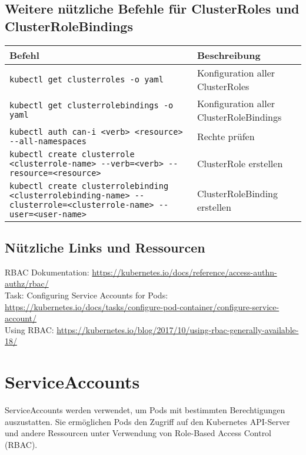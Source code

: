 \subsection{Weitere nützliche Befehle für ClusterRoles und ClusterRoleBindings}
\begin{tabular}{
|p{}|p{}|}
\hline
\textbf{Befehl} & \textbf{Beschreibung} \\
\hline
\texttt{kubectl get clusterroles -o yaml} & Konfiguration aller ClusterRoles \\
\texttt{kubectl get clusterrolebindings -o yaml} & Konfiguration aller ClusterRoleBindings \\
\texttt{kubectl auth can-i <verb> <resource> {-}{-}all-namespaces} & Rechte prüfen \\
\texttt{kubectl create clusterrole <clusterrole-name> {-}{-}verb=<verb> {-}{-}resource=<resource>} & ClusterRole erstellen \\
\texttt{kubectl create clusterrolebinding <clusterrolebinding-name> {-}{-}clusterrole=<clusterrole-name> {-}{-}user=<user-name>} & ClusterRoleBinding erstellen \\
\hline
\end{tabular}

\subsection*{Nützliche Links und Ressourcen}
RBAC Dokumentation: \url{https://kubernetes.io/docs/reference/access-authn-authz/rbac/}\\
Task: Configuring Service Accounts for Pods:\\
\url{https://kubernetes.io/docs/tasks/configure-pod-container/configure-service-account/}\\
Using RBAC: \url{https://kubernetes.io/blog/2017/10/using-rbac-generally-available-18/}\\


\section{ServiceAccounts}
ServiceAccounts werden verwendet, um Pods mit bestimmten Berechtigungen auszustatten. Sie ermöglichen Pods den Zugriff auf den Kubernetes API-Server und andere Ressourcen unter Verwendung von Role-Based Access Control (RBAC).\\

